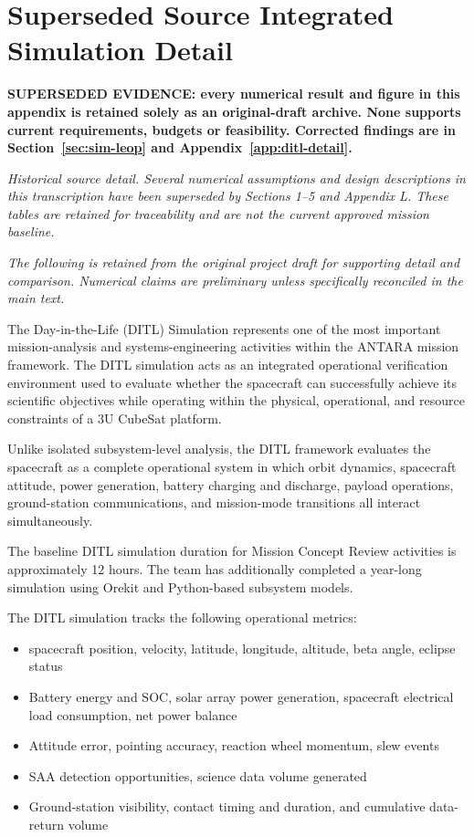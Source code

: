 \section{Superseded Source Integrated Simulation Detail}\label{app:source-04}
\noindent\textbf{SUPERSEDED EVIDENCE: every numerical result and figure in this appendix is retained solely as an original-draft archive. None supports current requirements, budgets or feasibility. Corrected findings are in Section~\ref{sec:sim-leop} and Appendix~\ref{app:ditl-detail}.}\par
\noindent\textit{Historical source detail. Several numerical assumptions and design descriptions in this transcription have been superseded by Sections 1--5 and Appendix L. These tables are retained for traceability and are not the current approved mission baseline.}

\noindent\textit{The following is retained from the original project draft for supporting detail and comparison. Numerical claims are preliminary unless specifically reconciled in the main text.}

The Day-in-the-Life (DITL) Simulation represents one of the most
important mission-analysis and systems-engineering activities within the
ANTARA mission framework. The DITL simulation acts as an integrated
operational verification environment used to evaluate whether the
spacecraft can successfully achieve its scientific objectives while
operating within the physical, operational, and resource constraints of
a 3U CubeSat platform.

Unlike isolated subsystem-level analysis, the DITL framework evaluates
the spacecraft as a complete operational system in which orbit dynamics,
spacecraft attitude, power generation, battery charging and discharge,
payload operations, ground-station communications, and mission-mode
transitions all interact simultaneously.

The baseline DITL simulation duration for Mission Concept Review
activities is approximately 12 hours. The team has additionally
completed a year-long simulation using Orekit and Python-based subsystem
models.

The DITL simulation tracks the following operational metrics:

\begin{itemize}
\item
  spacecraft position, velocity, latitude, longitude, altitude, beta
  angle, eclipse status
\item
  Battery energy and SOC, solar array power generation, spacecraft
  electrical load consumption, net power balance
\item
  Attitude error, pointing accuracy, reaction wheel momentum, slew
  events
\item
  SAA detection opportunities, science data volume generated
\item
  Ground-station visibility, contact timing and duration, and cumulative
  data-return volume
\end{itemize}

